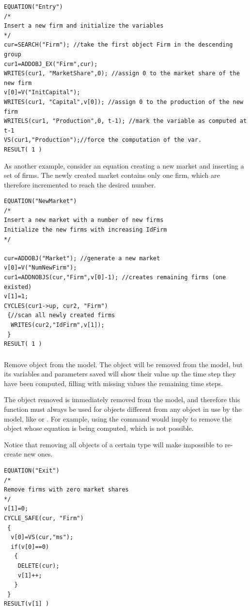 \documentclass [11pt,a4paper] {book}
\begin{document}
 \small
\begin{verbatim}
EQUATION("Entry")
/*
Insert a new firm and initialize the variables
*/
cur=SEARCH("Firm"); //take the first object Firm in the descending group
cur1=ADDOBJ_EX("Firm",cur);
WRITES(cur1, "MarketShare",0); //assign 0 to the market share of the new firm
v[0]=V("InitCapital");
WRITES(cur1, "Capital",v[0]); //assign 0 to the production of the new firm
WRITELS(cur1, "Production",0, t-1); //mark the variable as computed at t-1
VS(cur1,"Production");//force the computation of the var.
RESULT( 1 )
\end{verbatim}
\normalsize


As another example, consider an equation creating a new market and inserting a set of firms. The newly created market contains only one firm, which are therefore incremented to reach the desired number.

 \small
\begin{verbatim}
EQUATION("NewMarket")
/*
Insert a new market with a number of new firms
Initialize the new firms with increasing IdFirm
*/

cur=ADDOBJ("Market"); //generate a new market
v[0]=V("NumNewFirm");
cur1=ADDNOBJS(cur,"Firm",v[0]-1); //creates remaining firms (one existed)
v[1]=1;
CYCLES(cur1->up, cur2, "Firm")
 {//scan all newly created firms
  WRITES(cur2,"IdFirm",v[1]);
 }
RESULT( 1 )
\end{verbatim}
\normalsize



\subsubsection{ }
Remove object  from the model. The object will be removed from the model, but its variables and parameters saved will show their value up the time step they have been computed, filling with missing values the remaining time steps.

The object removed is immediately removed from the model, and therefore this function
must always be used for objects different from any object in use by the model, like  or . For example, using the command  would imply to remove the object whose equation is being
computed, which is not possible.

Notice that removing all objects of a certain type will make impossible to re-create new ones. 

\small
\begin{verbatim}
EQUATION("Exit")
/*
Remove firms with zero market shares
*/
v[1]=0;
CYCLE_SAFE(cur, "Firm")
 {
  v[0]=VS(cur,"ms");
  if(v[0]==0)
   {
    DELETE(cur);
    v[1]++;
   } 
 }
RESULT(v[1] )
\end{verbatim}
\normalsize
\end{document}
